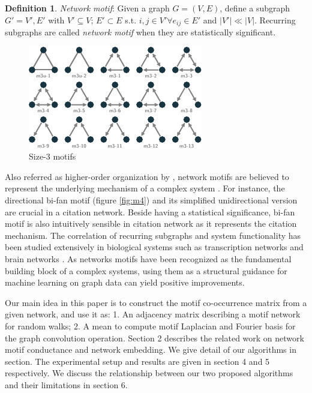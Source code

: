 \documentclass{article}
\theoremstyle{definition}
\newtheorem{definition}{Definition}[section]
\begin{document}
\begin{definition}{\emph{Network motif}}:
Given a graph $G = (V,E)$, define a subgraph $G' = {V', E'}$ with $V' 
\subseteq V$;
$E' \subset E$ s.t. $i,j \in V' \forall e_{ij} \in E'$ and $|V'| \ll |V|$. 
Recurring subgraphs are called \emph{network motif} when they are 
statistically significant.
\end{definition}

\begin{figure} \label{fig:m3}
    \centering
    \includegraphics[width=0.9\linewidth]{m3}
    \caption{Size-3 motifs}
\end{figure}

Also referred as higher-order organization by \citeauthor{juremotif}, 
network motifs are believed to represent the underlying mechanism of a 
complex system 
\cite{netmotif,alon2006introduction,mangan2003structure}. 
For instance, the directional bi-fan motif (figure \ref{fig:m4})
and its simplified unidirectional version are crucial in a citation 
network. Beside having a statistical significance, bi-fan motif is also 
intuitively sensible in citation network as it represents the citation 
mechanism. The correlation of recurring subgraphs and system 
functionality has been studied extensively in biological systems such as 
transcription networks \cite{mangan2003structure} and brain 
networks \cite{brainnetheuvel,honey2007network}. As networks motifs
have been recognized as the fundamental building block of a complex
systems, using them as a structural guidance for machine learning
on graph data can yield positive improvements.

Our main idea in this paper is to construct the motif co-occurrence matrix
from a given network, and use it as: 1. An adjacency matrix describing a 
motif network for random walks; 2. A mean to compute motif Laplacian and 
Fourier basis for the graph convolution operation. Section 2 describes the 
related work on network motif conductance and network embedding. We give 
detail of our algorithms in section. The experimental setup and results 
are given in section 4 and 5 respectively. We discuss the relationship 
between our two proposed algorithms and their limitations in section 6.
\end{document}
